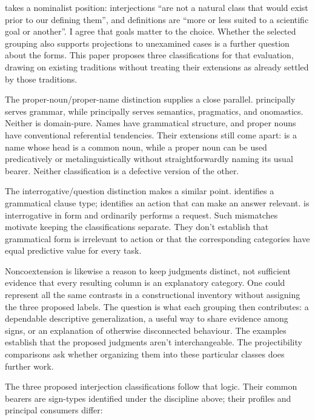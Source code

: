 \documentclass[12pt]{article}
\begin{document}
\textcite[3]{ponsonnet2025} takes a nominalist position: interjections \enquote{are not a natural class that would exist prior to our defining them}, and definitions are \enquote{more or less suited to a scientific goal or another}. I agree that goals matter to the choice. Whether the selected grouping also supports projections to unexamined cases is a further question about the forms. This paper proposes three classifications for that evaluation, drawing on existing traditions without treating their extensions as already settled by those traditions.

The proper-noun/proper-name distinction supplies a close parallel.  principally serves grammar, while  principally serves semantics, pragmatics, and onomastics. Neither is domain-pure. Names have grammatical structure, and proper nouns have conventional referential tendencies. Their extensions still come apart:  is a name whose head is a common noun, while a proper noun can be used predicatively or metalinguistically without straightforwardly naming its usual bearer. Neither classification is a defective version of the other.

The interrogative/question distinction makes a similar point.  identifies a grammatical clause type;  identifies an action that can make an answer relevant.  is interrogative in form and ordinarily performs a request. Such mismatches motivate keeping the classifications separate. They don't establish that grammatical form is irrelevant to action or that the corresponding categories have equal predictive value for every task.

Noncoextension is likewise a reason to keep judgments distinct, not sufficient evidence that every resulting column is an explanatory category. One could represent all the same contrasts in a constructional inventory without assigning the three proposed labels. The question is what each grouping then contributes: a dependable descriptive generalization, a useful way to share evidence among signs, or an explanation of otherwise disconnected behaviour. The examples establish that the proposed judgments aren't interchangeable. The projectibility comparisons ask whether organizing them into these particular classes does further work.

The three proposed interjection classifications follow that logic. Their common bearers are sign-types identified under the discipline above; their profiles and principal consumers differ:
\end{document}
